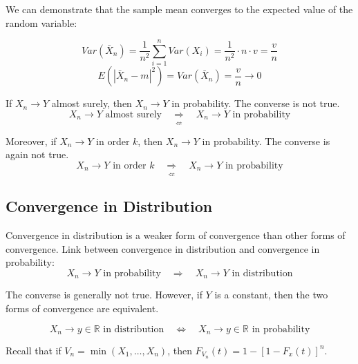We can demonstrate that the sample mean converges to the expected value of the random variable:

\[
Var(\bar{X}_n) = \frac{1}{n^2} \sum_{i=1}^{n} Var(X_i) = \frac{1}{n^2} \cdot n \cdot v = \frac{v}{n}
\]
\[
E(|\bar{X}_n - m|^2) = Var(\bar{X}_n) = \frac{v}{n} \to 0
\]


If $X_n \to Y$ almost surely, then $X_n \to Y$ in probability. The converse is not true.
\[
X_n \to Y \text{ almost surely} \quad \underset{\nLeftarrow}{\Rightarrow} \quad X_n \to Y \text{ in probability}
\]

Moreover, if $X_n \to Y$ in order $k$, then $X_n \to Y$ in probability. The converse is again not true.
\[
X_n \to Y \text{ in order } k \quad \underset{\nLeftarrow}{\Rightarrow} \quad X_n \to Y \text{ in probability}
\]

\subsection*{Convergence in Distribution}


Convergence in distribution is a weaker form of convergence than other forms of convergence.
Link between convergence in distribution and convergence in probability:
\[
X_n \to Y \text{ in probability} \quad \Rightarrow \quad X_n \to Y \text{ in distribution}
\]

The converse is generally not true. However, if $Y$ is a constant, then the two forms of convergence are equivalent.

\[
X_n \to y \in \mathbb{R} \text{ in distribution} \quad \Leftrightarrow \quad X_n \to y \in \mathbb{R} \text{ in probability}
\]


Recall that if $V_n = \min(X_1, \ldots , X_n)$, then $F_{V_n}(t) = 1- [1-F_x(t)]^n.$ 

